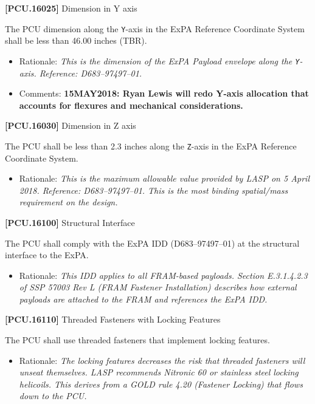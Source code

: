 \documentclass[12pt,oneside,oldfontcommands]{memoir}
\begin{document}
\textbf{[PCU.16025]} Dimension in Y axis

The \gls{PCU} dimension along the \texttt{Y}-axis in the \gls{ExPA} Reference Coordinate System shall be less than 46.00 inches (TBR\label{tbx_13}).

\begin{itemize}
\item{} Rationale: \emph{This is the dimension of the ExPA Payload envelope along the \texttt{Y}-axis. Reference: D683--97497--01.}

\item{} Comments: \textbf{15MAY2018: Ryan Lewis will redo Y-axis allocation that accounts for flexures and mechanical considerations.}

\end{itemize}

\textbf{[PCU.16030]} Dimension in Z axis

The \gls{PCU} shall be less than 2.3 inches along the \texttt{Z}-axis in the \gls{ExPA} Reference Coordinate System.

\begin{itemize}
\item{} Rationale: \emph{This is the maximum allowable value provided by LASP on 5 April 2018. Reference: D683--97497--01. This is the most binding spatial\slash mass requirement on the design.}

\end{itemize}

\textbf{[PCU.16100]} Structural Interface

The \gls{PCU} shall comply with the \gls{ExPA} \gls{IDD} (D683--97497--01) at the structural interface to the \gls{ExPA}.

\begin{itemize}
\item{} Rationale: \emph{This IDD applies to all FRAM-based payloads. Section E.3.1.4.2.3 of SSP 57003 Rev L (FRAM Fastener Installation) describes how external payloads are attached to the FRAM and references the ExPA IDD.}

\end{itemize}

\textbf{[PCU.16110]} Threaded Fasteners with Locking Features

The \gls{PCU} shall use threaded fasteners that implement locking features.

\begin{itemize}
\item{} Rationale: \emph{The locking features decreases the risk that threaded fasteners will unseat themselves. LASP recommends Nitronic 60 or stainless steel locking helicoils. This derives from a GOLD rule 4.20 (Fastener Locking) that flows down to the PCU.}

\end{itemize}
\end{document}
